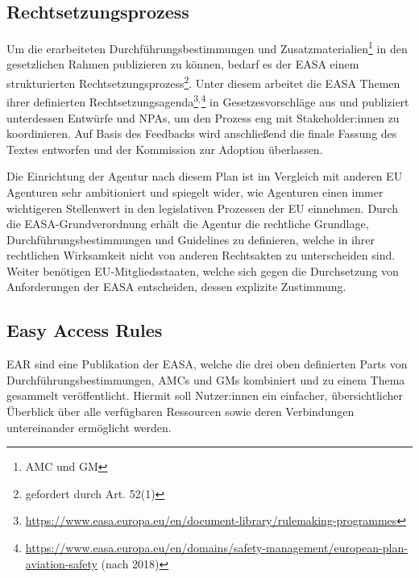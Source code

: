 \subsection{Rechtsetzungsprozess}

    Um die erarbeiteten Durchführungsbestimmungen und Zusatzmaterialien\footnote{\ac{AMC} und \ac{GM}} in den gesetzlichen Rahmen publizieren zu können, bedarf es der \ac{EASA} einem strukturierten Rechtsetzungsprozess\footnote{gefordert durch Art. 52(1) }.
    Unter diesem arbeitet die \ac{EASA} Themen ihrer definierten Rechtsetzungsagenda\footnote{\href{https://www.easa.europa.eu/en/document-library/rulemaking-programmes}{https://www.easa.europa.eu/en/document-library/rulemaking-programmes}}$^,$\footnote{\href{https://www.easa.europa.eu/en/domains/safety-management/european-plan-aviation-safety}{https://www.easa.europa.eu/en/domains/safety-management/european-plan-aviation-safety} (nach 2018)} in Gesetzesvorschläge aus und publiziert unterdessen Entwürfe und \acfp{NPA}, um den Prozess eng mit Stakeholder:innen zu koordinieren.
    Auf Basis des Feedbacks wird anschließend die finale Fassung des Textes entworfen und der Kommission zur Adoption überlassen. \cite[3]{easa_2017001r} 
        
    \pagebreak
    \noindent
    Die Einrichtung der Agentur nach diesem Plan ist im Vergleich mit anderen \ac{EU} Agenturen sehr ambitioniert und spiegelt wider, wie Agenturen einen immer wichtigeren Stellenwert in den legislativen Prozessen der \ac{EU} einnehmen. 
    Durch die \ac{EASA}-Grundverordnung erhält die Agentur die rechtliche Grundlage, Durchführungsbestimmungen und Guidelines zu definieren, welche in ihrer rechtlichen Wirksamkeit nicht von anderen Rechtsakten zu unterscheiden sind.
    Weiter benötigen \ac{EU}-Mitgliedsstaaten, welche sich gegen die Durchsetzung von Anforderungen der \ac{EASA} entscheiden, dessen explizite Zustimmung.   
    \cite[260]{easa_administrative_innovation}
            

\subsection{Easy Access Rules}

    \acf{EAR} sind eine Publikation der \ac{EASA}, welche die drei oben definierten Parts von Durchführungsbestimmungen, \acp{AMC} und \acp{GM} kombiniert und zu einem Thema gesammelt veröffentlicht.
    Hiermit soll Nutzer:innen ein einfacher, übersichtlicher Überblick über alle verfügbaren Ressourcen sowie deren Verbindungen untereinander ermöglicht werden.
    
